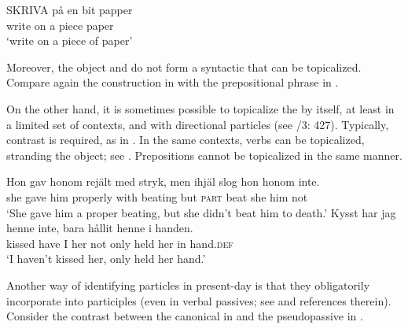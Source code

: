 \documentclass[output=paper]{langscibook}
\begin{document}
\ex\label{ex:lalu:10b}
\gll  SKRIVA  på   en  bit     papper \\
    write     on   a   piece    paper\\
\glt `write on a piece of paper'
\z
\z


Moreover, the object and  do not form a syntactic  that can be topicalized. Compare again the  construction in  with the  prepositional phrase in .


\ea\label{ex:lalu:11}
\z
\z


On the other hand, it is sometimes possible to topicalize the  by itself, at least in a limited set of contexts, and with directional particles (see \citealt{TelemanEtAl1999}/3: 427). Typically, contrast is required, as in . In the same contexts, verbs can be topicalized, stranding the object; see . Prepositions cannot be topicalized in the same manner.


\ea\label{ex:lalu:12}
\gll  Hon   gav     honom   rejält       med   stryk,     men   ihjäl        slog   hon  honom  inte. \\
she     gave     him   properly     with   beating     but     \textsc{part} beat   she   him     not\\
\glt `She gave him a proper beating, but she didn’t beat him to death.'
\ex\label{ex:lalu:13}
\gll  Kysst     har   jag   henne   inte,   bara   hållit  henne   i     handen.\\
kissed   have   I   her     not     only   held   her   in   hand\textsc{.def}\\
\glt `I haven’t kissed her, only held her hand.' \citep{Holmberg1997}\\
\z


Another way of identifying particles in present-day  is that they obligatorily incorporate into participles (even in verbal passives; see \citealt{Lundquist2014Passives} and references therein). Consider the contrast between the canonical  in  and the pseudopassive in .
\end{document}
